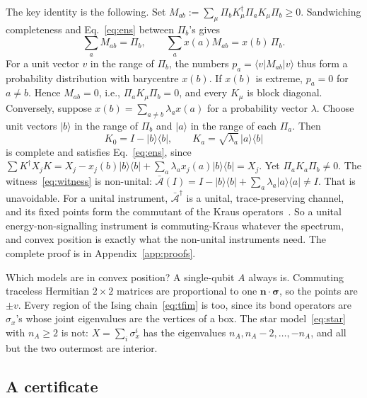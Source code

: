 \documentclass[aps,pra,twocolumn,reprint,superscriptaddress,nofootinbib,floatfix]{revtex4-2}
\theoremstyle{plain}
\theoremstyle{remark}
\newcommand{\Abar}{\bar{\mathcal{A}}}
\newcommand{\ket}[1]{|#1\rangle}
\newcommand{\bra}[1]{\langle #1|}
\newcommand{\proj}[1]{|#1\rangle\langle #1|}
\begin{document}
The key identity is the following. Set
$M_{ab}:=\sum_\mu\Pi_bK_\mu^\dagger\Pi_aK_\mu\Pi_b\ge0$. Sandwiching completeness and
Eq.~\eqref{eq:ens} between $\Pi_b$'s gives
\begin{equation}
\sum_aM_{ab}=\Pi_b ,\qquad \sum_ax(a)M_{ab}=x(b)\,\Pi_b .
\label{eq:blocks}
\end{equation}
For a unit vector $v$ in the range of $\Pi_b$, the numbers $p_a=\bra vM_{ab}\ket v$ thus form
a probability distribution with barycentre $x(b)$. If $x(b)$ is extreme, $p_a=0$ for
$a\neq b$. Hence $M_{ab}=0$, i.e., $\Pi_aK_\mu\Pi_b=0$, and every $K_\mu$ is block diagonal.
Conversely, suppose $x(b)=\sum_{a\neq b}\lambda_ax(a)$ for a probability vector $\lambda$.
Choose unit vectors $\ket b$ in the range of $\Pi_b$ and $\ket a$ in the range of each
$\Pi_a$. Then
\begin{equation}
K_0=I-\proj b ,\qquad K_a=\sqrt{\lambda_a}\,\ket a\!\bra b
\label{eq:witness}
\end{equation}
is complete and satisfies Eq.~\eqref{eq:ens}, since
$\sum K^\dagger X_jK=X_j-x_j(b)\proj b+\sum_a\lambda_ax_j(a)\proj b=X_j$. Yet
$\Pi_aK_a\Pi_b\neq0$. The witness~\eqref{eq:witness} is non-unital:
$\Abar(I)=I-\proj b+\sum_a\lambda_a\proj a\neq I$. That is unavoidable. For a unital
instrument, $\Abar^\dagger$ is a unital, trace-preserving channel, and its fixed points form
the commutant of the Kraus operators~\cite{AGG2002}. So a unital energy-non-signalling
instrument is commuting-Kraus whatever the spectrum, and convex position is exactly what the
non-unital instruments need. The complete proof is in Appendix~\ref{app:proofs}.

Which models are in convex position? A single-qubit $A$ always is. Commuting traceless
Hermitian $2\times2$ matrices are proportional to one $\bm n\cdot\bm\sigma$, so the points
are $\pm v$. Every region of the Ising chain~\eqref{eq:tfim} is too, since its bond operators
are $\sigma_x$'s whose joint eigenvalues are the vertices of a box. The star
model~\eqref{eq:star} with $n_A\ge2$ is not: $X=\sum_i\sigma_x^i$ has the eigenvalues
$n_A,n_A-2,\dots,-n_A$, and all but the two outermost are interior.

\subsection{A certificate}
\end{document}
